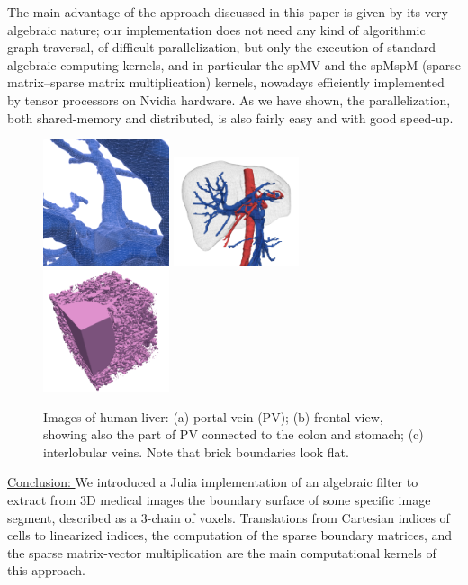 \documentclass{article}
\begin{document}
The main advantage of the approach discussed in this paper is given by its very algebraic nature; our implementation does not need any kind of algorithmic graph traversal, of difficult parallelization, but only the execution of standard algebraic computing kernels, and in particular the spMV and the spMspM (sparse matrix--sparse matrix multiplication) kernels, nowadays efficiently implemented by tensor processors on Nvidia hardware.  As we have shown, the parallelization, both shared-memory and distributed, is also fairly easy and with good speed-up.

\begin{figure}[tbp]
\includegraphics[height=0.3\textwidth,width=0.33\textwidth]{figs/image-1.png}%
\includegraphics[height=0.3\textwidth,width=0.33\textwidth]{figs/image-2.png}%
\includegraphics[height=0.3\textwidth,width=0.33\textwidth]{figs/image-3.png}%
\caption{Images of human liver: (a) portal vein (PV); (b) frontal view, showing also the part of PV connected to the colon and stomach; (c) interlobular veins. Note that brick boundaries look flat.}
\label{fig:schema}
\end{figure}


\newpage

\vspace{10pt}
\noindent\underline{
Conclusion:
}\vspace{0.2em}\newline 
We introduced a Julia implementation of an algebraic filter to extract from 3D medical images the
boundary surface of some specific image segment, described as a 3-chain of voxels. Translations from
Cartesian indices of cells to linearized indices, the computation of the sparse boundary matrices, and the
sparse matrix-vector multiplication are the main computational kernels of this approach. 
\end{document}
